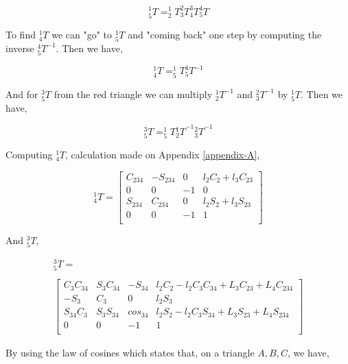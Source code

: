 \documentclass[transmag]{IEEEtran}
\begin{document}
\begin{equation}
^1_5T = ^1_2T  ^2_3T  ^3_4T  ^4_5T
\end{equation}

To find $^1_4T$ we can "go" to $^1_5T$ and "coming back" one step by computing the inverse $^4_5T^{-1}$. Then we have,

\begin{equation}
^1_4T = ^1_5T ^4_5T^{-1}
\end{equation}

And for $^3_5T$ from the red triangle we can multiply $^1_2T^{-1}$ and $^2_3T^{-1}$ by $^1_5T$. Then we have,

\begin{equation}
^3_5T = ^1_5T {^1_2T}^{-1}  {^2_3T}^{-1}
\end{equation}


Computing $^1_4T$, calculation made on Appendix \ref{appendix-A},

\begin{equation}
^1_4T = 
\begin{bmatrix}
C_{234} & -S_{234} & 0 & l_2 C_2 + l_3 C_{23} \\
0 & 0 & -1 & 0 \\
S_{234} & C_{234} & 0 & l_2 S_2 + l_3 S_{23} \\
0 & 0 & -1 & 1 \\
\end{bmatrix}
\end{equation}

And $^3_5T$,

\begin{equation}
\begin{matrix}
^3_5T = \\
\\
\begin{bmatrix}
C_{3}C_{34} & S_{3}C_{34} & -S_{34}  & l_2 C_2 - l_2 C_3 C_{34} + L_3 C_{23} + L_4 C_{234} \\
-S_3        & C_3         & 0        & l_2 S_3 \\
S_{34} C_3  & S_3 S_{34}  & cos_{34} & l_2 S_2 - l_2 C_3 S_{34} + L_3 S_{23} + L_4 S_{234}\\
0           & 0           & -1       & 1 \\
\end{bmatrix}
\end{matrix}
\end{equation}






By using the law of cosines which states that, on a triangle $A, B, C$, we have,
\end{document}
